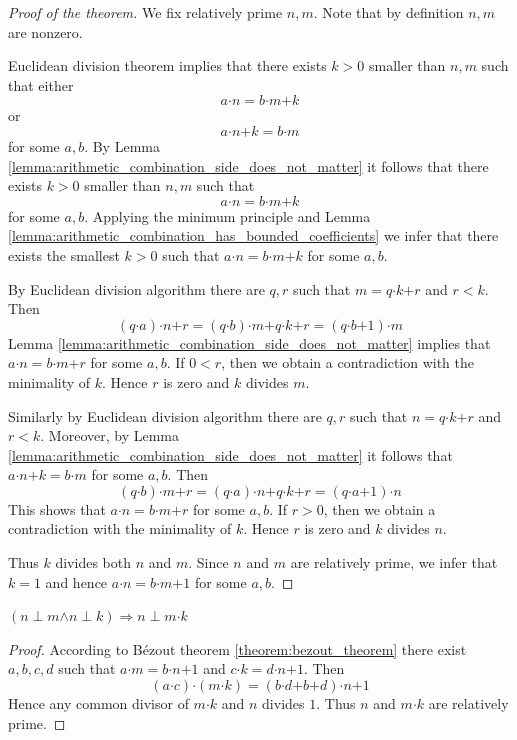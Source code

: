 \documentclass[10pt]{amsart}
\newcommand{\mra}{\boldsymbol{\Rightarrow}}
\newcommand{\mand}{\boldsymbol{\wedge}}
\newcommand{\mle}{\boldsymbol{<}}
\newcommand{\mge}{\boldsymbol{>}}
\newcommand{\meq}{\boldsymbol{=}}
\newcommand{\mplus}{\boldsymbol{+}}
\newcommand{\mdot}{\boldsymbol{\cdot}}
\begin{document}
\begin{proof}[Proof of the theorem]
	We fix relatively prime $n,m$. Note that by definition $n,m$ are nonzero.

	Euclidean division theorem implies that there exists $k \mge 0$ smaller than $n,m$ such that either
	$$a\mdot n \meq b\mdot m \mplus k$$
	or
	$$a\mdot n \mplus k \meq b\mdot m$$
	for some $a,b$. By Lemma \ref{lemma:arithmetic_combination_side_does_not_matter} it follows that there exists $k \mge 0$ smaller than $n,m$ such that
	$$a\mdot n \meq b\mdot m \mplus k$$
	for some $a,b$. Applying the minimum principle and Lemma \ref{lemma:arithmetic_combination_has_bounded_coefficients} we infer that there exists the smallest $k \mge 0$ such that $a\mdot n \meq b\mdot m \mplus k$ for some $a,b$.

	By Euclidean division algorithm there are $q,r$ such that $m \meq q\mdot k \mplus r$ and $r \mle k$. Then
	$$(q\mdot a)\mdot n \mplus r \meq (q\mdot b)\mdot m \mplus q\mdot k \mplus r \meq (q\mdot b \mplus 1)\mdot m$$
	Lemma \ref{lemma:arithmetic_combination_side_does_not_matter} implies that $a\mdot n \meq b\mdot m \mplus r$ for some $a,b$. If $0 \mle r$, then we obtain a contradiction with the minimality of $k$. Hence $r$ is zero and $k$ divides $m$.

	Similarly by Euclidean division algorithm there are $q,r$ such that $n \meq q \mdot k \mplus r$ and $r \mle k$. Moreover, by Lemma \ref{lemma:arithmetic_combination_side_does_not_matter} it follows that $a\mdot n \mplus k \meq b\mdot m$ for some $a,b$. Then
	$$(q\mdot b) \mdot m \mplus r \meq (q\mdot a) \mdot n \mplus q\mdot k \mplus r \meq (q\mdot a \mplus 1)\mdot n$$
	This shows that $a\mdot n \meq b\mdot m \mplus r$ for some $a,b$. If $r \mge 0$, then we obtain a contradiction with the minimality of $k$. Hence $r$ is zero and $k$ divides $n$.

	Thus $k$ divides both $n$ and $m$. Since $n$ and $m$ are relatively prime, we infer that $k \meq 1$ and hence $a\mdot n \meq b\mdot m \mplus 1$ for some $a,b$.
\end{proof}

\begin{corollary}\label{corollary:euclids_lemma}
	$\left(n \perp m \mand n \perp k\right) \mra n \perp m \mdot k$
\end{corollary}
\begin{proof}
	According to B{\'e}zout theorem \ref{theorem:bezout_theorem} there exist $a,b,c,d$ such that $a\mdot m \meq b\mdot n \mplus 1$ and $c\mdot k \meq d\mdot n \mplus 1$. Then
	$$(a\mdot c)\mdot (m\mdot k) \meq (b\mdot d \mplus b \mplus d) \mdot n \mplus 1$$
	Hence any common divisor of $m\mdot k$ and $n$ divides $1$. Thus $n$ and $m\mdot k$ are relatively prime.
\end{proof}
\end{document}
